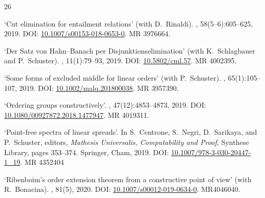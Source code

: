\documentclass[a4paper]{article}
\begin{document}
\begin{flushleft}
\begin{thebibliography}{26}

\newblock `Cut elimination for entailment relations' (with D.~Rinaldi).
, 58(5--6):605--625, 2019.
\newblock DOI: \href{https://doi.org/10.1007/s00153-018-0653-0}{10.1007/s00153-018-0653-0}.
\newblock MR 3976664.

\newblock `Der {S}atz von {Hahn--Banach} per {D}isjunktionselimination' (with K.~Schlagbauer and P.~Schuster).
, 11(1):79--93, 2019.
\newblock DOI: \href{https://doi.org/10.5802/cml.57}{10.5802/cml.57}.
\newblock MR 4002395.

\newblock `Some forms of excluded middle for linear orders' (with P.~Schuster).
, 65(1):105--107, 2019.
\newblock DOI: \href{https://doi.org/10.1002/malq.201800038}{10.1002/malq.201800038}.
\newblock MR 3957390.

\newblock `Ordering groups constructively'.
, 47(12):4853--4873, 2019.
\newblock DOI: \href{https://doi.org/10.1080/00927872.2018.1477947}{10.1080/00927872.2018.1477947}.
\newblock MR 4019311.

\newblock `Point-free spectra of linear spreads'.
\newblock In S.~Centrone, S.~Negri, D.~Sarikaya, and P.~Schuster, editors, {\em
  {M}athesis {U}niversalis, {C}omputability and {P}roof}, {S}ynthese {L}ibrary,
  pages 353--374. Springer, Cham, 2019.
\newblock DOI: \href{https://doi.org/10.1007/978-3-030-20447-1_19}{10.1007/978-3-030-20447-1\_19}.
\newblock MR 4352404

\newblock `Ribenboim's order extension theorem from a constructive point of view' (with R.~Bonacina).
, 81(5), 2020.
\newblock DOI: \href{https://doi.org/10.1007/s00012-019-0634-0}{10.1007/s00012-019-0634-0}.
\newblock MR4046040.


\end{thebibliography}
\end{flushleft}
\end{document}
